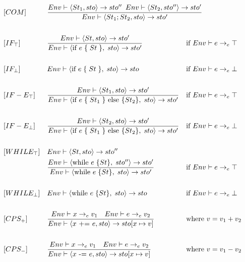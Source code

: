 \begin{align*}
&[COM] & &\frac{Env \vdash \langle St_1, sto \rangle \rightarrow sto^{\prime\prime} \enskip Env \vdash \langle St_2, sto^{\prime\prime} \rangle \rightarrow sto^\prime}{Env \vdash \langle St_1; St_2, sto \rangle \rightarrow sto^\prime} \span \span \\\\
%
&[IF_\top] & &\frac{Env \vdash \langle St, sto \rangle \rightarrow sto^\prime}{Env \vdash \langle \text{if } e\; \{\;St\;\},\; sto \rangle \rightarrow sto^\prime} & &\text{if } Env \vdash e \rightarrow_e \top\\\\
%
&[IF_\bot] & &Env \vdash \langle \text{if } e\; \{\;St\;\},\; sto \rangle \rightarrow sto & &\text{if } Env \vdash e \rightarrow_e \bot\\\\
%
&[IF-E_\top] & &\frac{Env \vdash \langle St_1, sto \rangle \rightarrow sto^\prime}{Env \vdash \langle \text{if } e\; \{\;St_1\;\} \text{ else } \{St_2\},\; sto \rangle \rightarrow sto^\prime} & &\text{if } Env \vdash e \rightarrow_e \top\\\\
%
&[IF-E_\bot] & &\frac{Env \vdash \langle St_2, sto \rangle \rightarrow sto^\prime}{Env \vdash \langle \text{if } e\; \{\;St_1\;\} \text{ else } \{St_2\},\; sto \rangle \rightarrow sto^\prime} & &\text{if } Env \vdash e \rightarrow_e \bot\\\\
%
&[WHILE_\top] & &Env \vdash \langle St, sto \rangle \rightarrow sto^{\prime\prime}\\
& & &\frac{Env \vdash \langle \text{while } e\; \{St\},\; sto^{\prime\prime} \rangle \rightarrow sto^\prime}{Env \vdash \langle \text{while } e\; \{St\},\; sto \rangle \rightarrow sto^\prime} & &\text{if } Env \vdash e \rightarrow_e \top\\\\
%
&[WHILE_\bot] & &Env \vdash \langle \text{while } e\; \{St\},\; sto \rangle \rightarrow sto & &\text{if } Env \vdash e \rightarrow_e \bot\\\\
&[CPS_+] & &\frac{Env \vdash x \rightarrow_e v_1 \quad Env \vdash e \rightarrow_e v_2}{Env \vdash \langle x \text{ += } e, sto \rangle \rightarrow sto[x \mapsto v]} & &\text{where } v = v_1 + v_2\\\\
%
&[CPS_-] & &\frac{Env \vdash x \rightarrow_e v_1 \quad Env \vdash e \rightarrow_e v_2}{Env \vdash \langle x \text{ -= } e, sto \rangle \rightarrow sto[x \mapsto v]} & &\text{where } v = v_1 - v_2\\\\

\end{align*}
